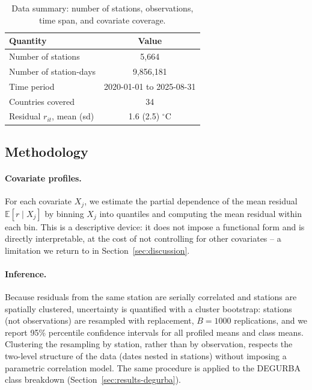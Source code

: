 \documentclass[a4paper,12pt,leqno]{article}
\begin{document}
\begin{table}[htbp]
\centering
\caption{Data summary: number of stations, observations, time span, and covariate coverage.}
\label{tab:data-summary}
\begin{tabular}{lc}
\toprule
Quantity & Value \\
\midrule
Number of stations & 5,664 \\
Number of station-days & 9,856,181 \\
Time period & 2020-01-01 to 2025-08-31 \\
Countries covered & 34 \\
Residual $r_{it}$, mean (sd) & 1.6 (2.5) $^\circ$C \\
\bottomrule
\end{tabular}
\end{table}

\subsection{Methodology}
\label{sec:methods}

\paragraph{Covariate profiles.} For each covariate $X_j$, we estimate the
partial dependence of the mean residual $\mathbb{E}[r \mid X_j]$ by
binning $X_j$ into quantiles and computing the mean residual within each
bin. This is a descriptive device: it does not impose a functional form
and is directly interpretable, at the cost of not controlling for other
covariates -- a limitation we return to in Section~\ref{sec:discussion}.

\paragraph{Inference.} Because residuals from the same station are
serially correlated and stations are spatially clustered, uncertainty is
quantified with a cluster bootstrap: stations (not observations) are
resampled with replacement, $B=1000$ replications, and we report 95\%
percentile confidence intervals for all profiled means and class means.
Clustering the resampling by station, rather than by observation,
respects the two-level structure of the data (dates nested in stations)
without imposing a parametric correlation model. The same procedure is
applied to the DEGURBA class breakdown (Section~\ref{sec:results-degurba}).
\end{document}
